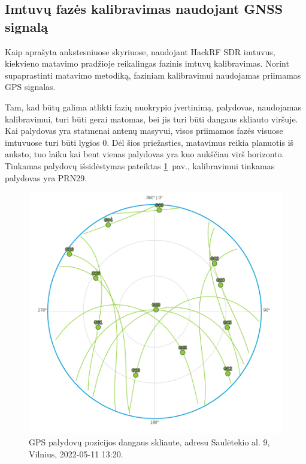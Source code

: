 \documentclass[main.tex]{subfiles}
\begin{document}
\subsection{Imtuvų fazės kalibravimas naudojant GNSS signalą}\label{sec:phase_clib_using_gnss}

Kaip aprašyta ankstesniuose skyriuose, naudojant HackRF SDR imtuvus, kiekvieno
matavimo pradžioje reikalingas fazinis imtuvų kalibravimas. Norint supaprastinti
matavimo metodiką, faziniam kalibravimui naudojamas priimamas GPS signalas.

Tam, kad būtų galima atlikti fazių nuokrypio įvertinimą, palydovas, naudojamas kalibravimui,
turi būti gerai matomas, bei jis turi būti dangaus skliauto viršuje.
Kai palydovas yra statmenai antenų masyvui, visos priimamos fazės visuose
imtuvuose turi būti lygios 0. Dėl šios priežasties, matavimus reikia
planuotis iš anksto, tuo laiku kai bent vienas palydovas yra
kuo aukščiau virš horizonto. Tinkamas palydovų išsidėstymas
pateiktas \ref{fig:gnss_sat_pos_calibartion}~pav.,
kalibravimui tinkamas palydovas yra PRN29.

\begin{figure}[ht]
    \begin{centering}
    \includegraphics[scale=1.2]{drawings/gnss_sattelites_position}
    \par\end{centering}
    \protect\caption{\label{fig:gnss_sat_pos_calibartion}GPS palydovų pozicijos dangaus skliaute, adresu Saulėtekio al. 9, Vilnius, 2022-05-11 13:20.}
\end{figure}
\end{document}
